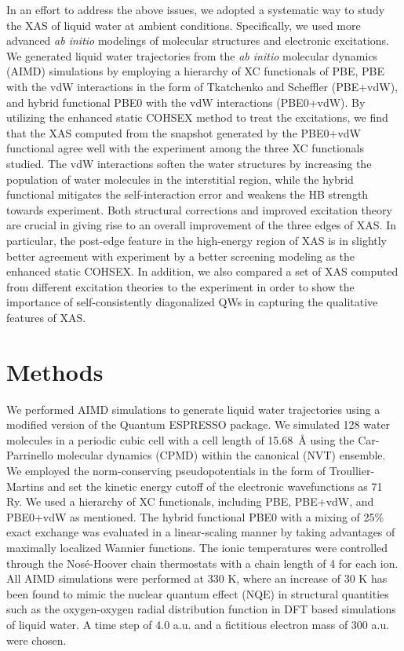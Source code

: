 \documentclass[prb,twocolumn,showpacs,preprintnumbers,superscriptaddress,amsmath,amssymb]{revtex4}
\begin{document}
In an effort to address the above issues,
we adopted a systematic way to study the XAS of liquid water at ambient conditions.
Specifically, we used more advanced {\it ab initio} modelings of molecular structures and electronic excitations.
We generated liquid water trajectories from 
the {\it ab initio} molecular dynamics (AIMD)\cite{85L-CPMD} simulations by employing a
hierarchy of XC functionals of PBE,\cite{perdew1996generalized}
PBE with the vdW interactions in the form of Tkatchenko and Scheffler (PBE+vdW),\cite{09vdW-TS} and
hybrid functional PBE0\cite{perdew1996rationale,adamo1999toward} with the vdW interactions (PBE0+vdW).
By utilizing the enhanced static COHSEX method to treat the excitations\cite{kang2010enhanced},
we find that the XAS computed from the snapshot generated by the PBE0+vdW functional
agree well with the experiment among the three XC functionals studied.
The vdW interactions soften the water structures by increasing the population of water molecules in the interstitial region,
while the hybrid functional mitigates the self-interaction error and weakens the HB strength towards experiment.\cite{distasio2014individual}
Both structural corrections and improved excitation theory are crucial in giving rise to an
overall improvement of the three edges of XAS.
In particular, the post-edge feature in the high-energy region of XAS is
in slightly better agreement with experiment by a
better screening modeling as the enhanced static COHSEX.
In addition, we also compared a set of XAS computed from different excitation theories to the experiment
in order to show the importance of self-consistently diagonalized QWs
in capturing the qualitative features of XAS.


\section{Methods}

We performed AIMD simulations to generate liquid water trajectories
using a modified version of the Quantum ESPRESSO package.\cite{codeQE}
We simulated 128 water molecules in a periodic cubic cell with a cell length of 15.68~\AA{} using
the Car-Parrinello molecular dynamics (CPMD)\cite{85L-CPMD} within the canonical (NVT) ensemble.
We employed the norm-conserving pseudopotentials in the form of Troullier-Martins\cite{troullier1991efficient}
and set the kinetic energy cutoff of the electronic wavefunctions as 71 Ry.
We used a hierarchy of XC functionals, including PBE, PBE+vdW, and PBE0+vdW as mentioned.
The hybrid functional PBE0 with a mixing of 25\% exact exchange
was evaluated in a linear-scaling manner by taking advantages of maximally localized Wannier functions.\cite{09B-Wu}
The ionic temperatures were controlled through
the Nos\'{e}-Hoover chain thermostats with a chain length of 4 for each ion.\cite{84JCP-Nose,85A-Hoover,92JCP-Martyna}
All AIMD simulations were performed at 330 K,
where an increase of 30 K has been found to mimic the nuclear quantum effect (NQE) in structural quantities such as the oxygen-oxygen radial distribution function
in DFT based simulations of liquid water.\cite{08L-Morrone}
A time step of 4.0 a.u. and a fictitious electron mass of 300 a.u. were chosen.
\end{document}
